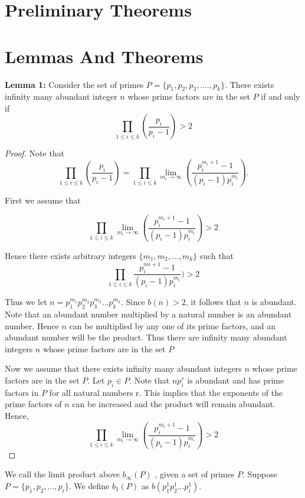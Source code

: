 \documentclass[../paper.tex]{subfiles}
\begin{document}
\section{Preliminary Theorems}

\section*{Lemmas And Theorems}\par\hspace{4ex}
\textbf{Lemma 1: } Consider the set of primes 
%
$P = \{p_{1}, p_{2}, p_{3}, .... , p_{k}\}$.
%
There exists infinity many abundant integer $n$ whose prime 
factors are in the set $P$  if and only if
%
$$\prod_{1 \leq i \leq k} (\frac{p_{i}}{p_{i} -1}) > 2$$
%

\begin{proof}

Note that
%  
$$\prod_{1 \leq i \leq k} (\frac{p_{i}}{p_{i} -1}) 
%
= \prod_{1 \leq i \leq k} \lim_{m_i \rightarrow \infty} 
%
( \frac{p_i^{m_{i} + 1} -1}{(p_i -1)p_{i}^{m_{i}}}). $$

First we assume that

  
$$\prod_{1 \leq i \leq k} \lim_{m_i \rightarrow \infty} 
( \frac{p_i^{m_{i} + 1} -1}{(p_i -1)p_{i}^{m_{i}}}) > 2$$

Hence there exists arbitrary integers $\{m_1, m_2, ... , m_k\}$ 
such that 
%
$$\prod_{1 \leq i \leq k} \frac{p_i^{m{i} + 1} -1}
{(p_i -1)p_{i}^{m_{i}}}) > 2$$
%

Thus we let $n=p_1^{m_1}p_2^{m_2}p_3^{m_3}...p_{k}^{m_k}$. 
Since $b(n) > 2$, it follows that $n$ is abundant. Note that an 
abundant number multiplied by a natural number is an abundant 
number. Hence $n$ can be multiplied by any one of its prime 
factors, and an abundant number will be the product. Thus there
are infinity many abundant integers $n$ whose prime factors are 
in the set $P$

Now we assume that there exists infinity many abundant integers 
$n$ whose prime factors are in the set $P$. Let $p_i \in P$. Note
that $np_i^r$ is abundant and has prime factors in $P$ for all 
natural numbers r. This implies that the exponents of the prime 
factors of $n$ can be increased and the product will remain abundant. Hence,
  $$\prod_{1 \leq i \leq k} \lim_{m_i \rightarrow \infty} ( \frac{p_i^{m_{i} + 1} -1}{(p_i -1)p_{i}^{m_{i}}}) > 2$$

\end{proof}

We call the limit product above $b_{\infty}(P)$ , given a set of primes
$P$. Suppose $P = \{p_1, p_2, ..., p_i \}$. We define $b_1(P)$ as
$b(p_1^1 p_2^1 ... p_i^1)$. \\
\end{document}

